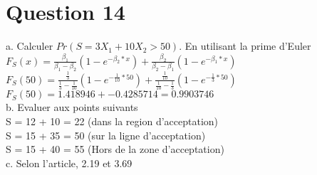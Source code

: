 \section{Question 14}

a. Calculer $Pr(S = 3X_1+10X_2 > 50)$. En utilisant la prime d'Euler\\
$F_S(x) = \frac{\beta_1}{\beta_1-\beta_2}(1-e^{-\beta_2*x}) +  \frac{\beta_2}{\beta_2-\beta_1}(1-e^{-\beta_1*x})$\\
$F_S(50) = \frac{\frac{1}{3}}{\frac{1}{3}-\frac{1}{10}}(1-e^{-\frac{1}{10}*50}) +  \frac{\frac{1}{10}}{\frac{1}{10}-\frac{1}{3}}(1-e^{-\frac{1}{3}*50})$\\
$F_S(50) = 1.418946 + -0.4285714 = 0.9903746$\\

b. Evaluer aux points suivants\\
S = 12 + 10 = 22 (dans la region d'acceptation)\\
S = 15 + 35 = 50 (sur la ligne d'acceptation)\\
S = 15 + 40 = 55 (Hors de la zone d'acceptation)\\

c. Selon l'article, 2.19 et 3.69\\